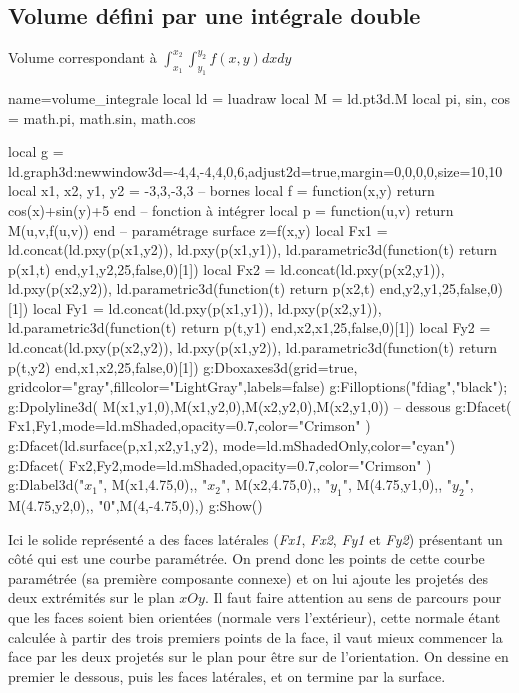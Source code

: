 \subsection{Volume défini par une intégrale double}
\begin{demo}{Volume correspondant à $\int_{x_1}^{x_2}\int_{y_1}^{y_2}f(x,y)dxdy$}
\begin{luadraw}{name=volume_integrale}
local ld = luadraw
local M = ld.pt3d.M
local pi, sin, cos = math.pi, math.sin, math.cos

local g = ld.graph3d:new{window3d={-4,4,-4,4,0,6},adjust2d=true,margin={0,0,0,0},size={10,10}}
local x1, x2, y1, y2 = -3,3,-3,3 -- bornes
local f = function(x,y) return cos(x)+sin(y)+5 end -- fonction à intégrer
local p = function(u,v) return M(u,v,f(u,v)) end -- paramétrage surface z=f(x,y)
local Fx1 = ld.concat({ld.pxy(p(x1,y2)), ld.pxy(p(x1,y1))}, ld.parametric3d(function(t) return p(x1,t) end,y1,y2,25,false,0)[1])
local Fx2 = ld.concat({ld.pxy(p(x2,y1)), ld.pxy(p(x2,y2))}, ld.parametric3d(function(t) return p(x2,t) end,y2,y1,25,false,0)[1])
local Fy1 = ld.concat({ld.pxy(p(x1,y1)), ld.pxy(p(x2,y1))}, ld.parametric3d(function(t) return p(t,y1) end,x2,x1,25,false,0)[1])
local Fy2 = ld.concat({ld.pxy(p(x2,y2)), ld.pxy(p(x1,y2))}, ld.parametric3d(function(t) return p(t,y2) end,x1,x2,25,false,0)[1])
g:Dboxaxes3d({grid=true, gridcolor="gray",fillcolor="LightGray",labels=false})
g:Filloptions("fdiag","black"); g:Dpolyline3d( {M(x1,y1,0),M(x1,y2,0),M(x2,y2,0),M(x2,y1,0)}) -- dessous
g:Dfacet( {Fx1,Fy1},{mode=ld.mShaded,opacity=0.7,color="Crimson"} )
g:Dfacet(ld.surface(p,x1,x2,y1,y2), {mode=ld.mShadedOnly,color="cyan"})
g:Dfacet( {Fx2,Fy2},{mode=ld.mShaded,opacity=0.7,color="Crimson"} )
g:Dlabel3d("$x_1$", M(x1,4.75,0),{}, "$x_2$", M(x2,4.75,0),{},
"$y_1$", M(4.75,y1,0),{}, "$y_2$", M(4.75,y2,0),{}, "$0$",M(4,-4.75,0),{})
g:Show()
\end{luadraw}
\end{demo}

Ici le solide représenté a des faces latérales (\emph{Fx1}, \emph{Fx2}, \emph{Fy1} et \emph{Fy2}) présentant un côté qui est une courbe paramétrée. On prend donc les points de cette courbe paramétrée (sa première composante connexe) et on lui ajoute les projetés des deux extrémités sur le plan $xOy$. Il faut faire attention au sens de parcours pour que les faces soient bien orientées (normale vers l'extérieur), cette normale étant calculée à partir des trois premiers points de la face, il vaut mieux commencer la face par les deux projetés sur le plan pour être sur de l'orientation.
On dessine en premier le dessous, puis les faces latérales, et on termine par la surface.

